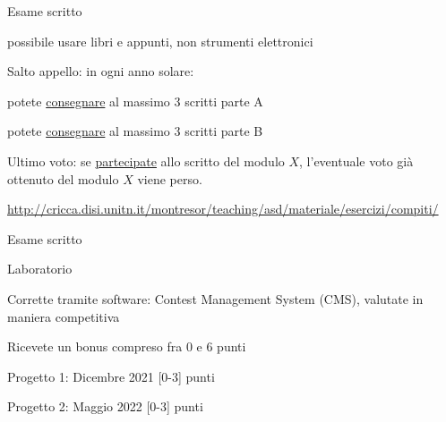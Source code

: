 \begin{frame}{Esame scritto}

\vspace{-9pt}
\begin{myboxtitle}
\BI
\item \EE possibile usare libri e appunti, non strumenti elettronici
\EI
\end{myboxtitle}

\begin{myboxtitle}[Regole]
\BI
\item \alert{Salto appello}: in ogni anno solare:
\BI
\item potete \underline{consegnare} al massimo \alert{3} scritti parte A
\item potete \underline{consegnare} al massimo \alert{3} scritti parte B
\EI
\item \alert{Ultimo voto}: se \underline{partecipate} allo scritto del modulo $X$, l'eventuale voto già ottenuto del modulo $X$ viene perso.
\EI
\end{myboxtitle}

\begin{myboxtitle}
\small
\url{http://cricca.disi.unitn.it/montresor/teaching/asd/materiale/esercizi/compiti/}
\end{myboxtitle}

\end{frame}
\begin{frame}{Esame scritto}
\vspace{-15pt}
\end{frame}
\begin{frame}{Laboratorio}
	
\vspace{-9pt}
\begin{myboxtitle}
\BI
\item Corrette tramite software: Contest Management System (CMS), valutate in maniera competitiva
\item Ricevete un bonus compreso fra 0 e 6 punti
\BI
\item Progetto 1: Dicembre 2021 [0-3] punti
\item Progetto 2: Maggio 2022 [0-3] punti
\EI
\EI
\end{myboxtitle}

\end{frame}

